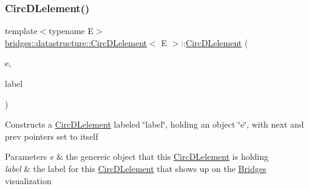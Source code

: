 \subsubsection{\texorpdfstring{Circ\+D\+Lelement()}{CircDLelement()}\hspace{0.1cm}{\footnotesize\ttfamily [2/4]}}
{\footnotesize\ttfamily template$<$typename E$>$ \\
\mbox{\hyperlink{classbridges_1_1datastructure_1_1_circ_d_lelement}{bridges\+::datastructure\+::\+Circ\+D\+Lelement}}$<$ E $>$\+::\mbox{\hyperlink{classbridges_1_1datastructure_1_1_circ_d_lelement}{Circ\+D\+Lelement}} (\begin{DoxyParamCaption}\item[{E}]{e,  }\item[{string}]{label }\end{DoxyParamCaption})\hspace{0.3cm}{\ttfamily [inline]}}

Constructs a \mbox{\hyperlink{classbridges_1_1datastructure_1_1_circ_d_lelement}{Circ\+D\+Lelement}} labeled \char`\"{}label\char`\"{}, holding an object \char`\"{}e\char`\"{}, with next and prev pointers set to itself 
\begin{DoxyParams}{Parameters}
{\em e} & the genereic object that this \mbox{\hyperlink{classbridges_1_1datastructure_1_1_circ_d_lelement}{Circ\+D\+Lelement}} is holding \\
\hline
{\em label} & the label for this \mbox{\hyperlink{classbridges_1_1datastructure_1_1_circ_d_lelement}{Circ\+D\+Lelement}} that shows up on the \mbox{\hyperlink{classbridges_1_1_bridges}{Bridges}} visualization \\
\hline
\end{DoxyParams}
\mbox{\label{classbridges_1_1datastructure_1_1_circ_d_lelement_a8db4aa80feb388d5206d657d80385f16}} 
